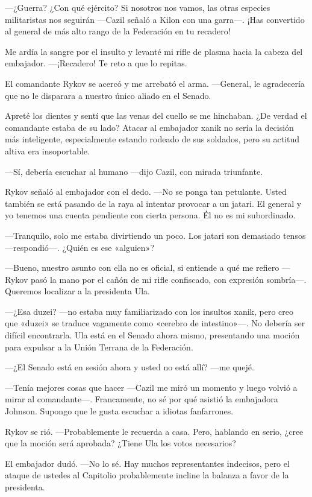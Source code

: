  —¿Guerra? ¿Con qué ejército? Si nosotros nos vamos, las otras especies militaristas nos seguirán —Cazil señaló a Kilon con una garra—. ¡Has convertido al general de más alto rango de la Federación en tu recadero!

Me ardía la sangre por el insulto y levanté mi rifle de plasma hacia la cabeza del embajador. —¡Recadero! Te reto a que lo repitas.

El comandante Rykov se acercó y me arrebató el arma. —General, le agradecería que no le disparara a nuestro único aliado en el Senado.

Apreté los dientes y sentí que las venas del cuello se me hinchaban. ¿De verdad el comandante estaba de su lado? Atacar al embajador xanik no sería la decisión más inteligente, especialmente estando rodeado de sus soldados, pero su actitud altiva era insoportable.

—Sí, debería escuchar al humano —dijo Cazil, con mirada triunfante.

Rykov señaló al embajador con el dedo. —No se ponga tan petulante. Usted también se está pasando de la raya al intentar provocar a un jatari. El general y yo tenemos una cuenta pendiente con cierta persona. Él no es mi subordinado.

—Tranquilo, solo me estaba divirtiendo un poco. Los jatari son demasiado tensos —respondió—. ¿Quién es ese «alguien»?

—Bueno, nuestro asunto con ella no es oficial, si entiende a qué me refiero —Rykov pasó la mano por el cañón de mi rifle confiscado, con expresión sombría—. Queremos localizar a la presidenta Ula.

 —¿Esa duzei? —no estaba muy familiarizado con los insultos xanik, pero creo que «duzei» se traduce vagamente como «cerebro de intestino»—. No debería ser difícil encontrarla. Ula está en el Senado ahora mismo, presentando una moción para expulsar a la Unión Terrana de la Federación.

 —¿El Senado está en sesión ahora y usted no está allí? —me quejé.

—Tenía mejores cosas que hacer —Cazil me miró un momento y luego volvió a mirar al comandante—. Francamente, no sé por qué asistió la embajadora Johnson. Supongo que le gusta escuchar a idiotas fanfarrones.

Rykov se rió. —Probablemente le recuerda a casa. Pero, hablando en serio, ¿cree que la moción será aprobada? ¿Tiene Ula los votos necesarios?

El embajador dudó. —No lo sé. Hay muchos representantes indecisos, pero el ataque de ustedes al Capitolio probablemente incline la balanza a favor de la presidenta.

